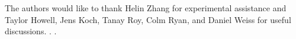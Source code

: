 \begin{acknowledgments}
  The authors would like to thank Helin Zhang for experimental assistance
  and Taylor Howell, Jens Koch, Tanay Roy, Colm Ryan, and Daniel Weiss for useful discussions.
  .
  .
\end{acknowledgments}
